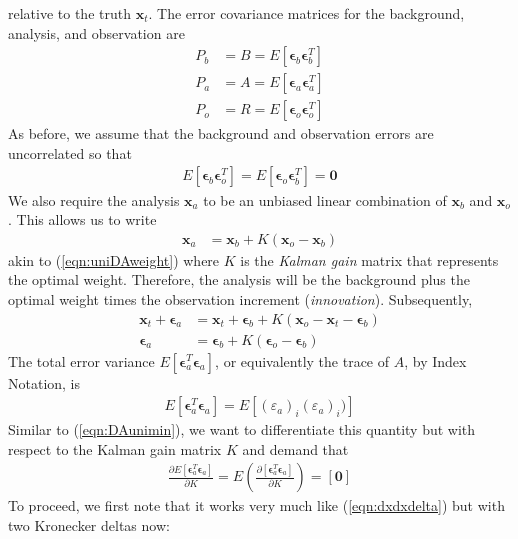 relative to the truth $\textbf{x}_t$. The error covariance matrices for the background, analysis, and observation are
\begin{subequations}
\label{eqn:OIPmat}
\begin{align}
P_b &= B = E[\bm{\epsilon}_b\bm{\epsilon}_b^T] \\
P_a &= A = E[\bm{\epsilon}_a\bm{\epsilon}_a^T] \\
P_o &= R = E[\bm{\epsilon}_o\bm{\epsilon}_o^T]
\end{align}    
\end{subequations}
As before, we assume that the background and observation errors are uncorrelated so that
\begin{align}
E[\bm{\epsilon}_b\bm{\epsilon}_o^T] = E[\bm{\epsilon}_o\bm{\epsilon}_b^T] = \textbf{0} \label{eqn:OIuncorr}
\end{align}
We also require the analysis $\textbf{x}_a$ to be an unbiased linear combination of $\textbf{x}_b$ and $\textbf{x}_o$. This allows us to write
\begin{align}
\textbf{x}_a &= \textbf{x}_b + K(\textbf{x}_o - \textbf{x}_b)  \label{eqn:OIinnov}
\end{align}
akin to (\ref{eqn:uniDAweight}) where $K$ is the \textit{Kalman gain} matrix that represents the optimal weight. Therefore, the analysis will be the background plus the optimal weight times the observation increment (\textit{innovation}). Subsequently,
\begin{align}
\textbf{x}_t + \bm{\epsilon}_a &= \textbf{x}_t + \bm{\epsilon}_b + K(\textbf{x}_o - \textbf{x}_t - \bm{\epsilon}_b) \nonumber \\
\bm{\epsilon}_a &= \bm{\epsilon}_b + K(\bm{\epsilon}_o - \bm{\epsilon}_b) \label{eqn:varakalman}
\end{align}
The total error variance $E[\bm{\epsilon}_a^T\bm{\epsilon}_a]$, or equivalently the trace of $A$, by Index Notation, is
\begin{align}
E[\bm{\epsilon}_a^T\bm{\epsilon}_a] = E[(\varepsilon_a)_i(\varepsilon_a)_i)]  
\end{align}
Similar to (\ref{eqn:DAunimin}), we want to differentiate this quantity but with respect to the Kalman gain matrix $K$ and demand that
\begin{align}
\frac{\partial E[\bm{\epsilon}_a^T\bm{\epsilon}_a]}{\partial K} = E\left(\frac{\partial [\bm{\epsilon}_a^T\bm{\epsilon}_a]}{\partial K}\right) = [\textbf{0}] \label{eqn:Kalmande0}
\end{align}
To proceed, we first note that it works very much like (\ref{eqn:dxdxdelta}) but with two Kronecker deltas now:
